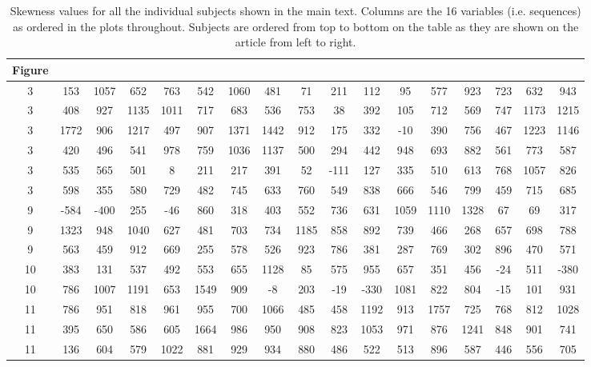 \documentclass[12pt,letterpaper]{article}
\begin{document}
\clearpage

\begin{table}[t]
\centering
\begin{adjustbox}{width=1\textwidth}
\begin{tabular}{c|cccccccccccccccc}
Figure & \\
\hline
3 & 153 & 1057 & 652 & 763 & 542 & 1060 & 481 & 71 & 211 & 112 & 95 & 577 & 923 & 723 & 632 & 943 \\ 
3 & 408 & 927 & 1135 & 1011 & 717 & 683 & 536 & 753 & 38 & 392 & 105 & 712 & 569 & 747 & 1173 & 1215 \\ 
3 & 1772 & 906 & 1217 & 497 & 907 & 1371 & 1442 & 912 & 175 & 332 & -10 & 390 & 756 & 467 & 1223 & 1146 \\ 
3 & 420 & 496 & 541 & 978 & 759 & 1036 & 1137 & 500 & 294 & 442 & 948 & 693 & 882 & 561 & 773 & 587 \\ 
3 & 535 & 565 & 501 & 8 & 211 & 217 & 391 & 52 & -111 & 127 & 335 & 510 & 613 & 768 & 1057 & 826 \\ 
3 & 598 & 355 & 580 & 729 & 482 & 745 & 633 & 760 & 549 & 838 & 666 & 546 & 799 & 459 & 715 & 685 \\ \hline
9 & -584 & -400 & 255 & -46 & 860 & 318 & 403 & 552 & 736 & 631 & 1059 & 1110 & 1328 & 67 & 69 & 317 \\ 
9 & 1323 & 948 & 1040 & 627 & 481 & 703 & 734 & 1185 & 858 & 892 & 739 & 466 & 268 & 657 & 698 & 788 \\ 
9 & 563 & 459 & 912 & 669 & 255 & 578 & 526 & 923 & 786 & 381 & 287 & 769 & 302 & 896 & 470 & 571 \\ \hline
10 & 383 & 131 & 537 & 492 & 553 & 655 & 1128 & 85 & 575 & 955 & 657 & 351 & 456 & -24 & 511 & -380 \\ 
10 & 786 & 1007 & 1191 & 653 & 1549 & 909 & -8 & 203 & -19 & -330 & 1081 & 822 & 804 & -15 & 101 & 931 \\ \hline
11 & 786 & 951 & 818 & 961 & 955 & 700 & 1066 & 485 & 458 & 1192 & 913 & 1757 & 725 & 768 & 812 & 1028 \\ 
11 & 395 & 650 & 586 & 605 & 1664 & 986 & 950 & 908 & 823 & 1053 & 971 & 876 & 1241 & 848 & 901 & 741 \\ 
11 & 136 & 604 & 579 & 1022 & 881 & 929 & 934 & 880 & 486 & 522 & 513 & 896 & 587 & 446 & 556 & 705 \\ \hline
\end{tabular}
\end{adjustbox}
\caption[]{Skewness values for all the individual subjects shown in the main text. Columns are the 16 variables (i.e. sequences) as ordered in the plots throughout. Subjects are ordered from top to bottom on the table as they are shown on the article from left to right.}
\end{table}
\end{document}
